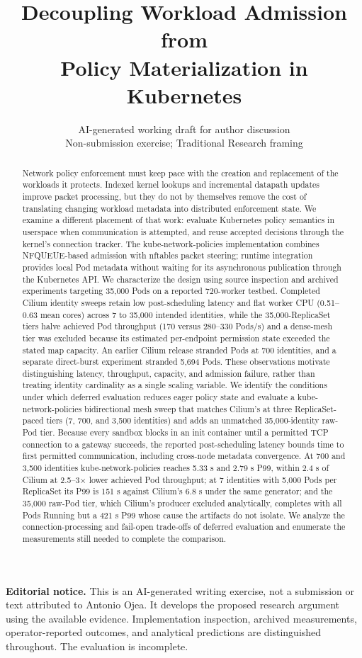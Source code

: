 \documentclass[letterpaper,twocolumn,10pt]{article}
\title{\Large\bf Decoupling Workload Admission from\\
Policy Materialization in Kubernetes}
\author{AI-generated working draft for author discussion\\
Non-submission exercise; Traditional Research framing}
\date{}
\begin{document}
\maketitle
\noindent\textbf{Editorial notice.} This is an AI-generated writing exercise,
not a submission or text attributed to Antonio Ojea. It develops the proposed
research argument using the available evidence. Implementation inspection,
archived measurements, operator-reported outcomes, and analytical predictions
are distinguished throughout. The evaluation is incomplete.

\begin{abstract}
Network policy enforcement must keep pace with the creation and replacement
of the workloads it protects. Indexed kernel lookups and incremental datapath
updates improve packet processing, but they do not by themselves remove the
cost of translating changing workload metadata into distributed enforcement
state. We examine a different placement of that work: evaluate Kubernetes
policy semantics in userspace when communication is attempted, and reuse
accepted decisions through the kernel's connection tracker. The
kube-network-policies implementation combines NFQUEUE-based admission with
nftables packet steering; runtime integration provides local Pod metadata
without waiting for its asynchronous publication through the Kubernetes API.
We characterize the design using source inspection and archived experiments
targeting 35,000 Pods on a reported 720-worker testbed. Completed Cilium
identity sweeps retain low post-scheduling latency and flat worker CPU
(0.51--0.63 mean cores) across 7 to 35,000 intended identities, while the
35,000-ReplicaSet tiers halve achieved Pod throughput (170 versus
280--330 Pods/s) and a dense-mesh tier was excluded because its estimated
per-endpoint permission state exceeded the stated map capacity. An earlier
Cilium release stranded Pods at 700 identities, and a separate direct-burst
experiment stranded 5,694 Pods. These observations motivate distinguishing
latency, throughput, capacity, and admission failure, rather than treating
identity cardinality as a single scaling variable. We identify the conditions
under which deferred evaluation reduces eager policy state and evaluate a
kube-network-policies bidirectional mesh sweep that matches Cilium's at
three ReplicaSet-paced tiers (7, 700, and 3,500 identities) and adds an
unmatched 35,000-identity raw-Pod tier. Because every sandbox blocks in an
init container until a permitted TCP connection to a gateway succeeds, the
reported post-scheduling latency bounds time to first permitted
communication, including cross-node metadata convergence. At 700 and
3,500 identities kube-network-policies reaches 5.33 s and 2.79 s P99,
within 2.4 s of Cilium at 2.5--3$\times$ lower achieved Pod throughput;
at 7 identities with 5,000 Pods per ReplicaSet its P99 is 151 s against
Cilium's 6.8 s under the same generator; and the 35,000 raw-Pod tier, which
Cilium's producer excluded analytically, completes with all Pods Running
but a 421 s P99 whose cause the artifacts do not isolate. We analyze the
connection-processing and fail-open trade-offs of deferred evaluation and
enumerate the measurements still needed to complete the comparison.
\end{abstract}
\end{document}
